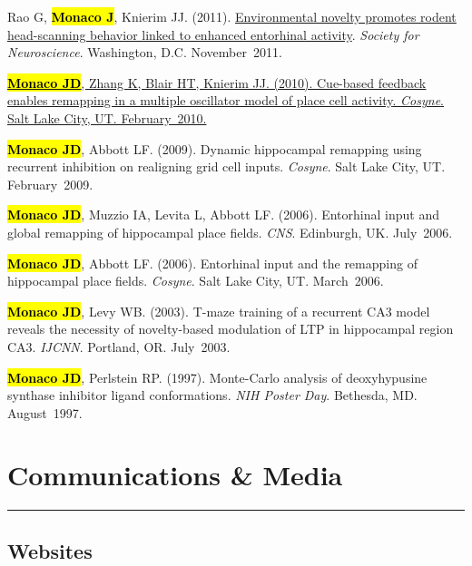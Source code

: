 \documentclass[10pt]{article}
\newcommand{\itemtitle}[1]{{\color{hopkinsblue}\ul{#1}}}
\newcommand{\unpubtitle}[1]{{\color{hopkinsblue} #1}}
\newcommand{\joehl}[1]{\hl{\textbf{#1}}}
\begin{document}
\begin{description}
    {Rao G, \joehl{Monaco J}, Knierim JJ. (2011). \itemtitle{Environmental
        novelty promotes rodent head-scanning behavior linked to enhanced entorhinal
      activity}. \emph{Society for Neuroscience}. Washington,
    D.C. November~2011.}
  \item[\quad]
    \href{https://www.frontiersin.org/10.3389/conf.fnins.2010.03.00192/event_abstract}
    {\joehl{Monaco JD}, Zhang K, Blair HT, Knierim JJ. (2010).
    \itemtitle{Cue-based feedback enables remapping in a multiple oscillator
      model of place cell activity}. \emph{Cosyne}. Salt Lake City, UT.
    February~2010.}
  \item[\quad] \joehl{Monaco JD}, Abbott LF. (2009). \unpubtitle{Dynamic
      hippocampal remapping using recurrent inhibition on realigning grid cell
    inputs}. \emph{Cosyne}. Salt Lake City, UT. February~2009.
  \item[\quad] \joehl{Monaco JD}, Muzzio IA, Levita L, Abbott LF. (2006).
    \unpubtitle{Entorhinal input and global remapping of hippocampal place
    fields}. \emph{CNS}. Edinburgh, UK. July~2006.
  \item[\quad] \joehl{Monaco JD}, Abbott LF. (2006). \unpubtitle{Entorhinal
    input and the remapping of hippocampal place fields}. \emph{Cosyne}. Salt Lake
    City, UT. March~2006.
  \item[\quad] \joehl{Monaco JD}, Levy WB. (2003). \unpubtitle{T-maze training
      of a recurrent CA3 model reveals the necessity of novelty-based modulation of
    LTP in hippocampal region CA3}. \emph{IJCNN}. Portland, OR. July~2003.
  \item[\quad] \joehl{Monaco JD}, Perlstein RP. (1997). \unpubtitle{Monte-Carlo
      analysis of deoxyhypusine synthase inhibitor ligand conformations}. \emph{NIH
    Poster Day}. Bethesda, MD. August~1997.
\end{description}

\section*{Communications \& Media}
\vspace{-0.1in}
\hrule
\vspace{0.2in}
\label{sec:comms}

\subsection*{Websites}
\end{document}
